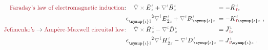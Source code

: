 \begin{subequations} \label{eq:Curl-EH}
	\abovedisplayskip=-8pt
\begin{align}
	\hspace{-0.5em}\textcolor{Maroon}{\text{Faraday's law of electromagnetic induction}}\text{:}&\hspace{1.2em} \mathcolor{gray}{\bar{\nabla} \times} \bar{E}^{\;\!\mathcolor{gray}{t}}_{\;\!\mathcolor{gray}{z}} + \mathcolor{gray}{\nabla^t} \bar{B}^{\;\!\mathcolor{gray}{t}}_{\;\!\mathcolor{gray}{z}} \hspace{-0.9em} &&= - \bar{K}^{\;\!\mathcolor{gray}{t}}_{\;\!\textcolor{Maroon}{\text{f}}\mathcolor{gray}{z}} \label{eq:Curl-EK} \\ 
	\hspace{-0.5em}&\epsilon^{\hphantom{\symup{\iota}\hat{1}}\hat{2}}_{\symup{\iota}\mathcolor{gray}{\hat{1}}} \mathcolor{gray}{\nabla^{\hat{1}}} E^{\;\!\mathcolor{gray}{t}}_{\;\! \hat{2}\mathcolor{gray}{z}} + \mathcolor{gray}{\nabla^t} B^{\;\!\mathcolor{gray}{t}}_{\;\! \symup{\iota}\mathcolor{gray}{z}} \hspace{-0.9em} &&= - {K}^{\;\!\mathcolor{gray}{t}}_{\;\! \textcolor{Maroon}{\text{f}} \symup{\iota}\mathcolor{gray}{z}}~, \label{eq:curl-EK} \\ 
	\hspace{-0.5em}\textcolor{Maroon}{\text{Jefimenko's}} \to \textcolor{Maroon}{\text{Amp\`{e}re-Maxwell circuital law}}\text{:}&\hspace{1.2em} \mathcolor{gray}{\bar{\nabla} \times} \bar{H}^{\;\!\mathcolor{gray}{t}}_{\;\!\mathcolor{gray}{z}} - \mathcolor{gray}{\nabla^t} \bar{D}^{\;\!\mathcolor{gray}{t}}_{\;\!\mathcolor{gray}{z}} \hspace{-0.9em} &&= \bar{J}^{\;\!\mathcolor{gray}{t}}_{\;\!\textcolor{Maroon}{\text{f}}\mathcolor{gray}{z}} \label{eq:Curl-H} \\ 
	\hspace{-0.5em}&\epsilon^{\hphantom{\symup{\iota}\hat{1}}\hat{2}}_{\symup{\iota}\mathcolor{gray}{\hat{1}}} \mathcolor{gray}{\nabla^{\hat{1}}} H^{\;\!\mathcolor{gray}{t}}_{\;\! \hat{2}\mathcolor{gray}{z}} - \mathcolor{gray}{\nabla^t} D^{\;\!\mathcolor{gray}{t}}_{\;\! \symup{\iota}\mathcolor{gray}{z}} \hspace{-0.9em} &&= J^{\;\!\mathcolor{gray}{t}}_{\;\! \textcolor{Maroon}{\text{f}} \symup{\iota}\mathcolor{gray}{z}}~. \label{eq:curl-H}
\end{align}
\end{subequations}
